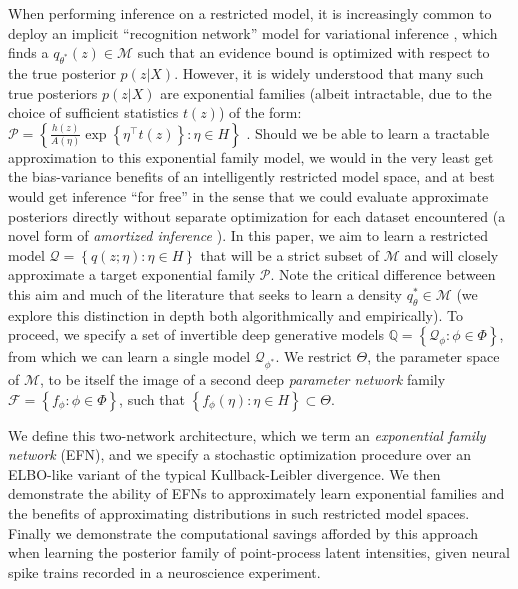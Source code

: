 \documentclass{article}
\begin{document}
When performing inference on a restricted model, it is increasingly common to deploy an implicit ``recognition network'' model for variational inference \citep{Kingma:2013aa}, which finds a $q_{\theta^*}(z) \in \mathcal{M}$ such that an evidence bound is optimized with respect to the true posterior $p(z|X)$.  However, it is widely understood that many such true posteriors $p(z|X)$ are exponential families (albeit intractable, due to the choice of sufficient statistics $t(z)$) of the form: $\mathcal{P} = \left\{ \frac{h(z)}{A(\eta)} \exp\left\{ \eta^\top t(z) \right \} : \eta \in H \right\}$ \citep{wainwright2008graphical}.   Should we be able to learn a tractable approximation to this exponential family model, we would in the very least get the bias-variance benefits of an intelligently restricted model space, and at best would get inference ``for free'' in the sense that we could evaluate approximate posteriors directly without separate optimization for each dataset encountered (a novel form of \emph{amortized inference} \citep{gershman2014amortized,Kingma:2013aa,rezende2014stochastic,stuhlmuller2013learning}).  
 In this paper, we aim to learn a restricted model $\mathcal{Q} = \left\{ q(z; \eta): \eta \in H \right\}$ that will be a strict subset of $\mathcal{M}$ and will closely approximate a target exponential family $\mathcal{P}$.  Note the critical difference between this aim and much of the literature that seeks to learn a density $q_{\theta}^* \in \mathcal{M}$ (we explore this distinction in depth both algorithmically and empirically).  To proceed, we specify a set of invertible deep generative models $\mathbb{Q} = \left\{ \mathcal{Q}_\phi : \phi \in \Phi \right\}$, from which we can learn a single model $\mathcal{Q}_{\phi^*}$.  We restrict $\Theta$, the parameter space of $\mathcal{M}$, to be itself the image of a second deep \emph{parameter network} family $\mathcal{F} = \left\{f_\phi : \phi \in \Phi\right\}$, such that $\left\{ f_\phi(\eta) : \eta \in H \right\} \subset \Theta$.

We define this two-network architecture, which we term an \emph{exponential family network} (EFN), and we specify a stochastic optimization procedure over an ELBO-like variant of the typical Kullback-Leibler divergence.  We then demonstrate the ability of EFNs to approximately learn exponential families and the benefits of approximating distributions in such restricted model spaces.  Finally we demonstrate the computational savings afforded by this approach when learning the posterior family of point-process latent intensities, given neural spike trains recorded in a neuroscience experiment.
\end{document}
